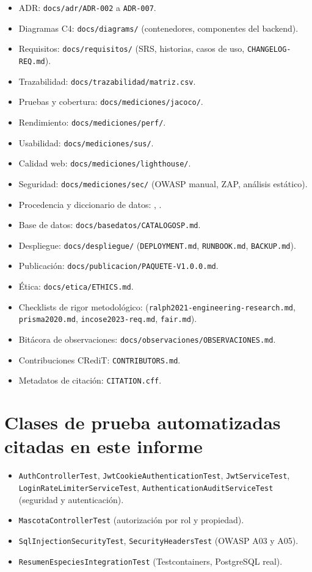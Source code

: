 \begin{itemize}[nosep]
  \item ADR: \texttt{docs/adr/ADR-002} a \texttt{ADR-007}.
  \item Diagramas C4: \texttt{docs/diagrams/} (contenedores, componentes del backend).
  \item Requisitos: \texttt{docs/requisitos/} (SRS, historias, casos de uso, \texttt{CHANGELOG-REQ.md}).
  \item Trazabilidad: \texttt{docs/trazabilidad/matriz.csv}.
  \item Pruebas y cobertura: \texttt{docs/mediciones/jacoco/}.
  \item Rendimiento: \texttt{docs/mediciones/perf/}.
  \item Usabilidad: \texttt{docs/mediciones/sus/}.
  \item Calidad web: \texttt{docs/mediciones/lighthouse/}.
  \item Seguridad: \texttt{docs/mediciones/sec/} (OWASP manual, ZAP, an\'alisis est\'atico).
  \item Procedencia y diccionario de datos: , .
  \item Base de datos: \texttt{docs/basedatos/CATALOGOSP.md}.
  \item Despliegue: \texttt{docs/despliegue/} (\texttt{DEPLOYMENT.md}, \texttt{RUNBOOK.md}, \texttt{BACKUP.md}).
  \item Publicaci\'on: \texttt{docs/publicacion/PAQUETE-V1.0.0.md}.
  \item \'Etica: \texttt{docs/etica/ETHICS.md}.
  \item Checklists de rigor metodol\'ogico:  (\texttt{ralph2021-engineering-research.md}, \texttt{prisma2020.md}, \texttt{incose2023-req.md}, \texttt{fair.md}).
  \item Bit\'acora de observaciones: \texttt{docs/observaciones/OBSERVACIONES.md}.
  \item Contribuciones CRediT: \texttt{CONTRIBUTORS.md}.
  \item Metadatos de citaci\'on: \texttt{CITATION.cff}.
\end{itemize}

\section{Clases de prueba automatizadas citadas en este informe}

\small
\begin{itemize}[nosep]
  \item \texttt{AuthControllerTest}, \texttt{JwtCookieAuthenticationTest},
    \texttt{JwtServiceTest}, \texttt{LoginRateLimiterServiceTest},
    \texttt{AuthenticationAuditServiceTest} (seguridad y autenticaci\'on).
  \item \texttt{MascotaControllerTest} (autorizaci\'on por rol y propiedad).
  \item \texttt{SqlInjectionSecurityTest}, \texttt{SecurityHeadersTest}
    (OWASP A03 y A05).
  \item \texttt{ResumenEspeciesIntegrationTest} (Testcontainers, PostgreSQL real).
\end{itemize}
\normalsize

